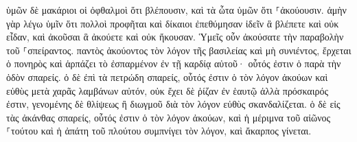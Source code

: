 \documentclass{openreader}
\begin{document}
ὑμῶν δὲ μακάριοι οἱ ὀφθαλμοὶ ὅτι βλέπουσιν, καὶ τὰ ὦτα ὑμῶν ὅτι ⸀ἀκούουσιν. 
ἀμὴν γὰρ λέγω ὑμῖν ὅτι πολλοὶ προφῆται καὶ δίκαιοι ἐπεθύμησαν ἰδεῖν ἃ βλέπετε καὶ οὐκ εἶδαν, καὶ ἀκοῦσαι ἃ ἀκούετε καὶ οὐκ ἤκουσαν. 
Ὑμεῖς οὖν ἀκούσατε τὴν παραβολὴν τοῦ ⸀σπείραντος. 
παντὸς ἀκούοντος τὸν λόγον τῆς βασιλείας καὶ μὴ συνιέντος, ἔρχεται ὁ πονηρὸς καὶ ἁρπάζει τὸ ἐσπαρμένον ἐν τῇ καρδίᾳ αὐτοῦ· οὗτός ἐστιν ὁ παρὰ τὴν ὁδὸν σπαρείς. 
ὁ δὲ ἐπὶ τὰ πετρώδη σπαρείς, οὗτός ἐστιν ὁ τὸν λόγον ἀκούων καὶ εὐθὺς μετὰ χαρᾶς λαμβάνων αὐτόν, 
οὐκ ἔχει δὲ ῥίζαν ἐν ἑαυτῷ ἀλλὰ πρόσκαιρός ἐστιν, γενομένης δὲ θλίψεως ἢ διωγμοῦ διὰ τὸν λόγον εὐθὺς σκανδαλίζεται. 
ὁ δὲ εἰς τὰς ἀκάνθας σπαρείς, οὗτός ἐστιν ὁ τὸν λόγον ἀκούων, καὶ ἡ μέριμνα τοῦ αἰῶνος ⸀τούτου καὶ ἡ ἀπάτη τοῦ πλούτου συμπνίγει τὸν λόγον, καὶ ἄκαρπος γίνεται. 
\end{document}
